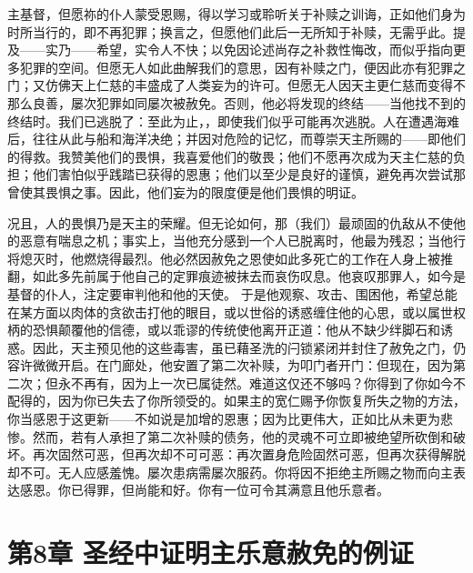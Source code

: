 主基督，但愿祢的仆人蒙受恩赐，得以学习或聆听关于补赎之训诲，正如他们身为时所当行的，即不再犯罪；换言之，但愿他们此后一无所知于补赎，无需乎此。提及——实乃——希望，实令人不快；以免因论述尚存之补救性悔改，而似乎指向更多犯罪的空间。但愿无人如此曲解我们的意思，因有补赎之门，便因此亦有犯罪之门；又仿佛天上仁慈的丰盛成了人类妄为的许可。但愿无人因天主更仁慈而变得不那么良善，屡次犯罪如同屡次被赦免。否则，他必将发现的终结——当他找不到的终结时。我们已逃脱了：至此为止，，即使我们似乎可能再次逃脱。人在遭遇海难后，往往从此与船和海洋决绝；并因对危险的记忆，而尊崇天主所赐的——即他们的得救。我赞美他们的畏惧，我喜爱他们的敬畏；他们不愿再次成为天主仁慈的负担；他们害怕似乎践踏已获得的恩惠；他们以至少是良好的谨慎，避免再次尝试那曾使其畏惧之事。因此，他们妄为的限度便是他们畏惧的明证。\par

况且，人的畏惧乃是天主的荣耀。但无论如何，那（我们）最顽固的仇敌从不使他的恶意有喘息之机；事实上，当他充分感到一个人已脱离时，他最为残忍；当他行将熄灭时，他燃烧得最烈。他必然因赦免之恩使如此多死亡的工作在人身上被推翻，如此多先前属于他自己的定罪痕迹被抹去而哀伤叹息。他哀叹那罪人，如今是基督的仆人，注定要审判他和他的天使。 于是他观察、攻击、围困他，希望总能在某方面以肉体的贪欲击打他的眼目，或以世俗的诱惑缠住他的心思，或以属世权柄的恐惧颠覆他的信德，或以乖谬的传统使他离开正道：他从不缺少绊脚石和诱惑。因此，天主预见他的这些毒害，虽已藉圣洗的闩锁紧闭并封住了赦免之门，仍容许微微开启。在门廊处，他安置了第二次补赎，为叩门者开门：但现在，因为第二次；但永不再有，因为上一次已属徒然。难道这仅还不够吗？你得到了你如今不配得的，因为你已失去了你所领受的。如果主的宽仁赐予你恢复所失之物的方法，你当感恩于这更新——不如说是加增的恩惠；因为比更伟大，正如比从未更为悲惨。然而，若有人承担了第二次补赎的债务，他的灵魂不可立即被绝望所砍倒和破坏。再次固然可恶，但再次却不可可恶：再次置身危险固然可恶，但再次获得解脱却不可。无人应感羞愧。屡次患病需屡次服药。你将因不拒绝主所赐之物而向主表达感恩。你已得罪，但尚能和好。你有一位可令其满意且他乐意者。\par


\section{第8章 圣经中证明主乐意赦免的例证}

